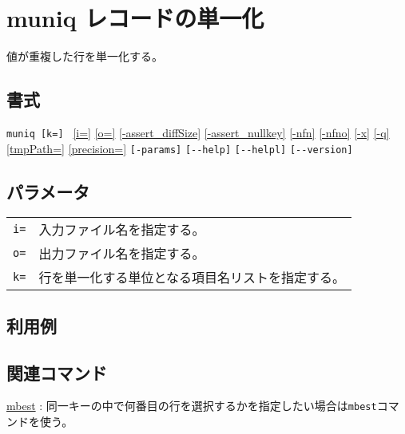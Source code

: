 
%

\section{muniq レコードの単一化\label{sect:muniq}}
値が重複した行を単一化する。

\subsection*{書式}
\verb|muniq [k=] |
\hyperref[sect:option_i]{[i=]}
\hyperref[sect:option_o]{[o=]}
\hyperref[sect:option_assert_diffSize]{[-assert\_diffSize]}
\hyperref[sect:option_assert_nullkey]{[-assert\_nullkey]}
\hyperref[sect:option_nfn]{[-nfn]} 
\hyperref[sect:option_nfno]{[-nfno]}  
\hyperref[sect:option_x]{[-x]}
\hyperref[sect:option_q]{[-q]}
\hyperref[sect:option_option_tmppath]{[tmpPath=]}
\hyperref[sect:option_precision]{[precision=]}
\verb|[-params]|
\verb|[--help]|
\verb|[--helpl]|
\verb|[--version]|\\

\subsection*{パラメータ}
\begin{table}[htbp]
{\small
\begin{tabular}{ll}
\verb|i=|    & 入力ファイル名を指定する。\\
\verb|o=|    & 出力ファイル名を指定する。\\
\verb|k=|    & 行を単一化する単位となる項目名リストを指定する。\\
\end{tabular} 
}
\end{table} 

\subsection*{利用例}

\subsection*{関連コマンド}
\hyperref[sect:mbest]{mbest} : 同一キーの中で何番目の行を選択するかを指定したい場合は\verb|mbest|コマンドを使う。

%
